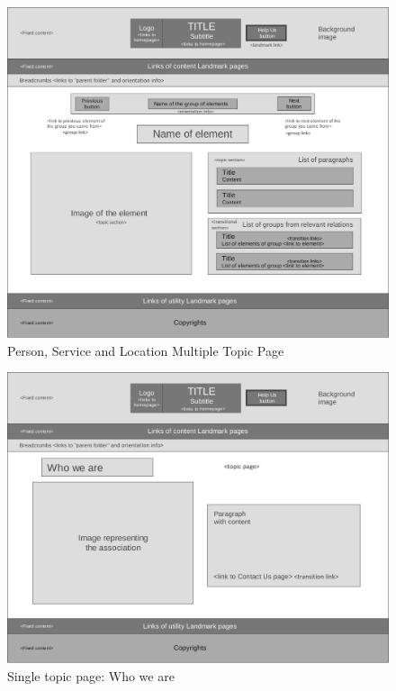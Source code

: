 %
\begin{figure}[h]
\includegraphics[width=1.3\textwidth, center]{MainMatter/images/3-Multiple-topic-page}
\caption{Person, Service and Location Multiple Topic Page}
\label{fig:figure2}
\end{figure}
%
\begin{figure}[h]
\includegraphics[width=1.3\textwidth, center]{MainMatter/images/4-Single-topic-who-we-are}
\caption{Single topic page: Who we are}
\label{fig:figure2}
\end{figure}
%
